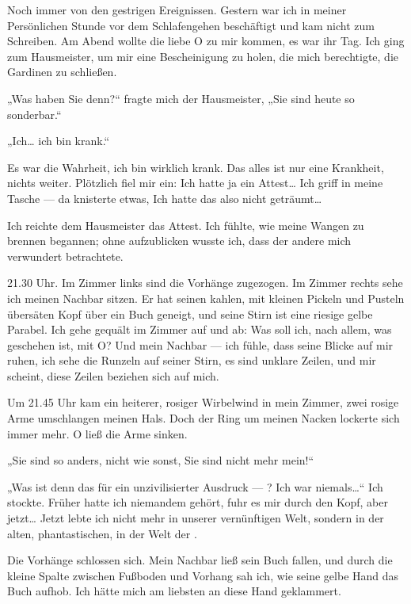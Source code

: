 Noch immer von den gestrigen Ereignissen. Gestern war ich in meiner
Persönlichen Stunde vor dem Schlafengehen beschäftigt und kam nicht
zum Schreiben. Am Abend wollte die liebe O zu mir kommen, es war
ihr Tag. Ich ging zum Hausmeister, um mir eine Bescheinigung zu
holen, die mich berechtigte, die Gardinen zu schließen.

„Was haben Sie denn?“ fragte mich der Hausmeister, „Sie sind heute
so sonderbar.“

„Ich\ldots{} ich bin krank.“

Es war die Wahrheit, ich bin wirklich krank. Das alles ist nur eine
Krankheit, nichts weiter. Plötzlich fiel mir ein: Ich hatte ja ein
Attest\ldots{} Ich griff in meine Tasche — da knisterte etwas, Ich hatte
das also nicht geträumt\ldots{}

Ich reichte dem Hausmeister das Attest.
Ich fühlte, wie meine Wangen zu brennen begannen; ohne aufzublicken
wusste ich, dass der andere mich verwundert betrachtete.

21.30 Uhr.
Im Zimmer links sind die Vorhänge zugezogen. Im Zimmer rechts sehe
ich meinen Nachbar sitzen. Er hat seinen kahlen, mit kleinen
Pickeln und Pusteln übersäten Kopf über ein Buch geneigt, und seine
Stirn ist eine riesige gelbe Parabel. Ich gehe gequält im Zimmer
auf und ab: Was soll ich, nach allem, was geschehen ist, mit O? Und
mein Nachbar — ich fühle, dass seine Blicke auf mir ruhen, ich sehe
die Runzeln auf seiner Stirn, es sind unklare Zeilen, und mir
scheint, diese Zeilen beziehen sich auf mich.

Um 21.45 Uhr kam ein
heiterer, rosiger Wirbelwind in
mein Zimmer, zwei rosige Arme umschlangen meinen Hals. Doch der
Ring um meinen Nacken lockerte sich immer mehr. O ließ die Arme
sinken.

„Sie sind so anders, nicht wie sonst, Sie sind nicht mehr mein!“

„Was ist denn das für ein unzivilisierter Ausdruck — ? Ich war
niemals\ldots{}“ Ich stockte. Früher hatte ich niemandem gehört, fuhr es
mir durch den Kopf, aber jetzt\ldots{} Jetzt lebte ich nicht mehr in
unserer vernünftigen Welt, sondern in der alten, phantastischen, in
der Welt der \wurzel{}.

Die Vorhänge schlossen sich. Mein Nachbar ließ sein Buch fallen,
und durch die kleine Spalte zwischen Fußboden und Vorhang sah ich,
wie seine gelbe Hand das Buch aufhob. Ich hätte mich am liebsten an
diese Hand geklammert.

